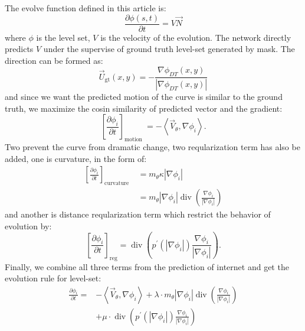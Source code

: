 \documentclass[journal]{IEEEtran}
\begin{document}
The evolve function defined in this article is:
\begin{equation}
  \frac{\partial \phi(s, t)}{\partial t}=V \vec{N}
\end{equation}
where $\phi$ is the level set, $V$ is the velocity of the evolution. The network directly predicts $V$ under the supervise of ground truth level-set generated by mask. The direction can be formed as:
\begin{equation}
  \vec{U}_{\mathrm{gt}}(x, y)=-\frac{\nabla \phi_{D T}(x, y)}{\left|\nabla \phi_{D T}(x, y)\right|}
\end{equation}
and since we want the predicted motion of the curve is similar to the ground truth, we maximize the cosin similarity of predicted vector and the gradient:
\begin{equation}
  \left[\frac{\partial \phi_{i}}{\partial t}\right]_{\text {motion }}=-\left\langle\vec{V}_{\theta}, \nabla \phi_{i}\right\rangle.
\end{equation}
Two prevent the curve from dramatic change, two reqularization term has also be added, one is curvature, in the form of:
\begin{equation}
  \begin{aligned}
  \left[\frac{\partial \phi_{i}}{\partial t}\right]_{\text {curvature }} &=m_{\theta} \kappa\left|\nabla \phi_{i}\right| \\
  &=m_{\theta}\left|\nabla \phi_{i}\right| \operatorname{div}\left(\frac{\nabla \phi_{i}}{\left|\nabla \phi_{i}\right|}\right) 
  \end{aligned}
\end{equation}
and another is distance reqularization term which restrict the behavior of evolution by:
\begin{equation}
  \left[\frac{\partial \phi_{i}}{\partial t}\right]_{\mathrm{reg}}=\operatorname{div}\left(p^{\prime}\left(\left|\nabla \phi_{i}\right|\right) \frac{\nabla \phi_{i}}{\left|\nabla \phi_{i}\right|}\right).
\end{equation}
Finally, we combine all three terms from the prediction of internet and get the evolution rule for level-set:
\begin{equation}
  \begin{aligned}
  \frac{\partial \phi_{i}}{\partial t}=&-\left\langle\vec{V}_{\theta}, \nabla \phi_{i}\right\rangle+\lambda \cdot m_{\theta}\left|\nabla \phi_{i}\right| \operatorname{div}\left(\frac{\nabla \phi_{i}}{\left|\nabla \phi_{i}\right|}\right) \\
  &+\mu \cdot \operatorname{div}\left(p^{\prime}\left(\left|\nabla \phi_{i}\right|\right) \frac{\nabla \phi_{i}}{\left|\nabla \phi_{i}\right|}\right)
  \end{aligned}
\end{equation}
\end{document}
